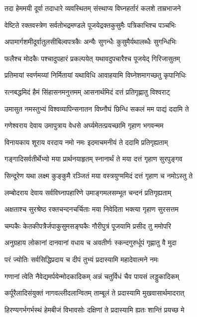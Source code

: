 \twolineshloka
{तदा हेममयी दूर्वा तदाधारे व्यवस्थितम्}
{संस्थाप्य विघ्नहर्तारं कलशे ताम्रभाजने} %

\twolineshloka
{वेष्टिते रक्तवस्त्रेण सर्वतोभद्रमण्डले}
{पूजयेद्रक्तकुसुमैः पत्रिकाभिश्च पञ्चभिः} %

\twolineshloka
{अपामार्गशमीदूर्वातुलसीबिल्वपत्रकैः}
{अन्यैः सुगन्धैः कुसुमैर्यथालब्धैः सुगन्धिभिः} %

\twolineshloka
{फलैश्च मोदकैः पश्चादुपहारं प्रकल्पयेत्}
{यथावदुपचारैश्च पूजयेद् गिरिजासुतम्} %

\twolineshloka
{प्रतिमायां स्वर्णमय्यां निर्मितायां यथाविधि}
{आवाहयामि विघ्नेशमागच्छतु कृपानिधिः} %

\twolineshloka
{रत्नबद्धमिदं हैमं सिंहासनमनुत्तमम्}
{आसनार्थमिदं दत्तं प्रतिगृह्णातु विश्वराट्} %

\twolineshloka
{उमासुत नमस्तुभ्यं विश्वव्यापिन्सनातन}
{विघ्नौघं छिन्धि सकलं मम पाद्यं ददामि ते} %

\twolineshloka
{गणेश्वराय देवाय उमापुत्राय वेधसे}
{अर्घ्यमेतत्प्रयच्छामि गृहाण भगवन्मम} %

\twolineshloka
{विनायकाय शूराय वरदाय नमो नमः}
{इदमाचमनीयं ते ददामि प्रतिगृह्यताम्} %

\twolineshloka
{गङ्गादिसर्वतीर्थेभ्यो मया प्रार्थनयाहृतम्}
{स्नानार्थं ते मया दत्तं गृहाण सुरपुङ्गव} %

\twolineshloka
{सिन्दूरेण यथा लक्ष्म कुङ्कुमै रञ्जितं मया}
{वस्त्रयुग्ममिदं दत्तं गृहाण च नमोऽस्तु ते} %

\twolineshloka
{लम्बोदराय देवाय सर्वविघ्नापहारिणे}
{उमाङ्गमलसम्भूत चन्दनं प्रतिगृह्यताम्} %

\twolineshloka
{अक्षताश्च सुरश्रेष्ठ रक्तचन्दनचर्चिताः}
{मया निवेदिता भक्त्या गृहाण सुरसत्तम} %

\twolineshloka
{चम्पकैः केतकीपत्रैर्जपाकुसुमसङ्घकैः}
{गौरीपुत्रं पूजयामि प्रसीद तु ममोपरि} %

\twolineshloka
{अनुग्रहाय लोकानां दानवानां वधाय च}
{अवतीर्णः स्कन्दगुरुर्धूपं गृह्णातु वै मुदा} %

\twolineshloka
{परं ज्योतिः सर्वसिद्धिप्रदाय च}
{दीपं तुभ्यं प्रदास्यामि महादेवात्मने नमः} %

\twolineshloka
{गणानां त्वेति नैवेद्यमर्पयेन्मोदकादिकम्}
{अन्नं चतुर्विधं चैव पायसं लड्डुकादिकम्} %

\twolineshloka
{कर्पूरैलादिसंयुक्तं नागवल्लीदलान्वितम्}
{ताम्बूलं ते प्रदास्यामि मुखवासार्थमादरात्} %

\twolineshloka
{हिरण्यगर्भगर्भस्थं हेमबीजं विभावसोः}
{दक्षिणां ते प्रदास्यामि ह्यतः शान्तिं प्रयच्छ मे} %

